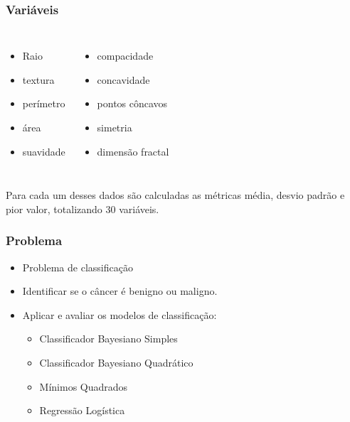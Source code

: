 \documentclass{beamer}
\begin{document}
\begin{frame}
\frametitle{Variáveis}
\begin{columns}[c] %
\begin{itemize}
\item Raio
\item textura
\item perímetro
\item área
\item suavidade
\end{itemize}
\begin{itemize}
\item compacidade
\item concavidade
\item  pontos côncavos
\item simetria
\item  dimensão fractal
\end{itemize}
\end{columns}
\begin{block}{}
Para cada um desses dados são calculadas as métricas média, desvio padrão e pior valor, totalizando 30 variáveis.
\end{block}
\end{frame}

\begin{frame}
\frametitle{Problema}
\begin{itemize}
\item Problema de classificação
\item Identificar se o câncer é benigno ou maligno.
\item Aplicar e avaliar os modelos de classificação:
\begin{itemize}
\item Classificador Bayesiano Simples
\item Classificador Bayesiano Quadrático
\item Mínimos Quadrados
\item Regressão Logística
\end{itemize}
\end{itemize}
\end{frame}



\end{document}
